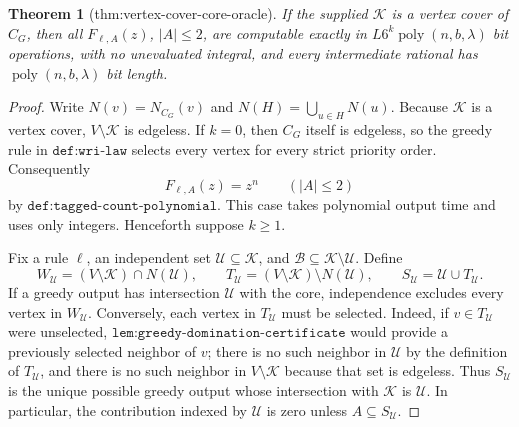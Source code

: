 \documentclass{article}
\newtheorem{theorem}{Theorem}
\begin{document}
\begin{theorem}[thm:vertex-cover-core-oracle]\label{thm:vertex-cover-core-oracle}
If the supplied \(\mathcal K\) is a vertex cover of \(C_G\), then all \(F_{\ell,A}(z)\), \(|A|\le2\), are computable exactly in \(L6^k\operatorname{poly}(n,b,\lambda)\) bit operations, with no unevaluated integral, and every intermediate rational has \(\operatorname{poly}(n,b,\lambda)\) bit length.
\end{theorem}
\begin{proof}
Write \(N(v)=N_{C_G}(v)\) and \(N(H)=\bigcup_{u\in H}N(u)\).  Because \(\mathcal K\) is a vertex cover, \(V\setminus\mathcal K\) is edgeless.  If \(k=0\), then \(C_G\) itself is edgeless, so the greedy rule in \(\texttt{def:wri-law}\) selects every vertex for every strict priority order.  Consequently
\[
 F_{\ell,A}(z)=z^n
 \qquad (|A|\leq 2)
\]
by \(\texttt{def:tagged-count-polynomial}\).  This case takes polynomial output time and uses only integers.  Henceforth suppose \(k\geq1\).

Fix a rule \(\ell\), an independent set \(\mathcal U\subseteq\mathcal K\), and \(\mathcal B\subseteq\mathcal K\setminus\mathcal U\).  Define
\[
 W_{\mathcal U}=(V\setminus\mathcal K)\cap N(\mathcal U),
 \qquad
 T_{\mathcal U}=(V\setminus\mathcal K)\setminus N(\mathcal U),
 \qquad
 S_{\mathcal U}=\mathcal U\cup T_{\mathcal U}.
\]
If a greedy output has intersection \(\mathcal U\) with the core, independence excludes every vertex in \(W_{\mathcal U}\).  Conversely, each vertex in \(T_{\mathcal U}\) must be selected.  Indeed, if \(v\in T_{\mathcal U}\) were unselected, \(\texttt{lem:greedy-domination-certificate}\) would provide a previously selected neighbor of \(v\); there is no such neighbor in \(\mathcal U\) by the definition of \(T_{\mathcal U}\), and there is no such neighbor in \(V\setminus\mathcal K\) because that set is edgeless.  Thus \(S_{\mathcal U}\) is the unique possible greedy output whose intersection with \(\mathcal K\) is \(\mathcal U\).  In particular, the contribution indexed by \(\mathcal U\) is zero unless \(A\subseteq S_{\mathcal U}\).


\end{proof}
\end{document}
